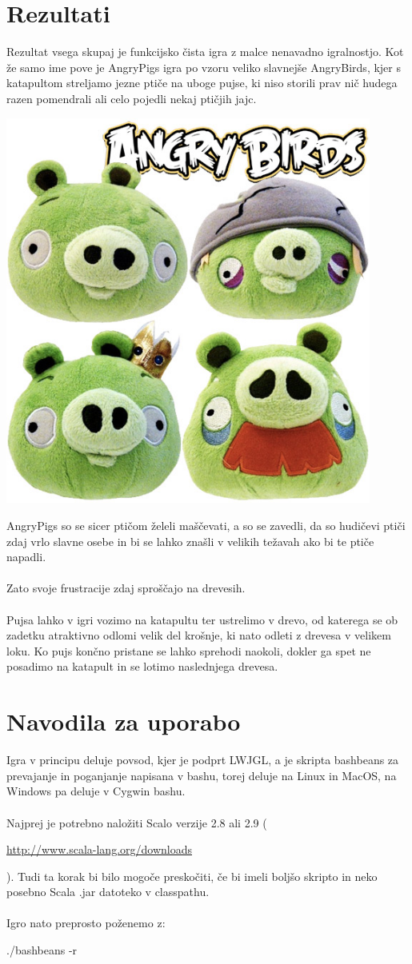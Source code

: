\documentclass[10pt,a4paper,oneside]{book}
\newcommand\inline[1]{%
\begin{Sbox}{#1}\end{Sbox}%
\colorbox{lightgray}{\TheSbox}%
}
\newcommand\br{%
 \ \\ \ \\%
}
\begin{document}
\chapter{Rezultati}
Rezultat vsega skupaj je funkcijsko čista igra z malce nenavadno
igralnostjo. Kot že samo ime pove je AngryPigs igra po vzoru veliko
slavnejše AngryBirds, kjer s katapultom streljamo jezne ptiče na uboge
pujse, ki niso storili prav nič hudega razen pomendrali ali celo
pojedli nekaj ptičjih jajc.

\begin{center}
\includegraphics[width=12cm]{PigPlushies.jpg}
\end{center}
AngryPigs so se sicer ptičom želeli maščevati, a so se zavedli, da so
hudičevi ptiči zdaj vrlo slavne osebe in bi se lahko znašli v velikih
težavah ako bi te ptiče napadli.
\br
Zato svoje frustracije zdaj sproščajo na drevesih.
\br
Pujsa lahko v igri vozimo na katapultu ter ustrelimo v drevo, od
katerega se ob zadetku atraktivno odlomi velik del krošnje, ki nato
odleti z drevesa v velikem loku. Ko pujs končno pristane se lahko
sprehodi naokoli, dokler ga spet ne posadimo na katapult in se lotimo
naslednjega drevesa.

\chapter{Navodila za uporabo}
Igra v principu deluje povsod, kjer je podprt LWJGL, a je skripta bashbeans za prevajanje in poganjanje napisana v bashu, torej deluje na Linux in MacOS, na Windows pa deluje v Cygwin bashu.\br
Najprej je potrebno naložiti Scalo verzije 2.8 ali 2.9 (\inline{\url{http://www.scala-lang.org/downloads}}). Tudi ta korak bi bilo mogoče preskočiti, če bi imeli boljšo skripto in neko posebno Scala .jar datoteko v classpathu.
\br
Igro nato preprosto poženemo z: \inline{./bashbeans -r}
\end{document}
